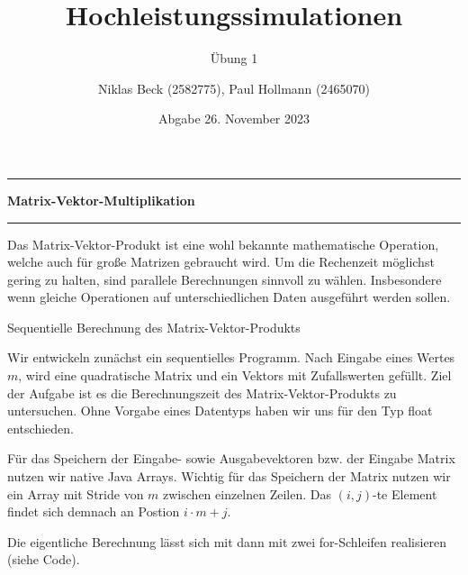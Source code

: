 \documentclass[
ngerman,
subtask=ruled %
]{tudaexercise}
\begin{document}
	
	\title[Übung Hochleistungssimulationen]{Hochleistungssimulationen}
	\subtitle{\"Ubung 1}
	\author{Niklas Beck (2582775), Paul Hollmann (2465070)}
	\date{Abgabe 26. November 2023}
	\maketitle
	
	\hrule
	{\Large \textbf{Matrix-Vektor-Multiplikation}}
	\hrule
	
	Das Matrix-Vektor-Produkt ist eine wohl bekannte mathematische Operation, welche auch für große Matrizen gebraucht wird.
	Um die Rechenzeit möglichst gering zu halten, sind parallele Berechnungen sinnvoll zu wählen.
	Insbesondere wenn gleiche Operationen auf unterschiedlichen Daten ausgeführt werden sollen.%
	
	\begin{task}{Sequentielle Berechnung des Matrix-Vektor-Produkts}\label{task:1}
	
		
		Wir entwickeln zunächst ein sequentielles Programm.
		Nach Eingabe eines Wertes $m$, wird eine quadratische Matrix und ein Vektors mit Zufallswerten gefüllt.  Ziel der Aufgabe ist es die Berechnungszeit des Matrix-Vektor-Produkts zu untersuchen.
		Ohne Vorgabe eines Datentyps haben wir uns für den Typ float entschieden.

		
		Für das Speichern der Eingabe- sowie Ausgabevektoren bzw. der Eingabe Matrix nutzen wir native Java Arrays.
		Wichtig für das Speichern der Matrix nutzen wir ein Array mit Stride von $m$ zwischen einzelnen Zeilen.
		Das $(i,j)$-te Element findet sich demnach an Postion $i\cdot m + j$.
		
		Die eigentliche Berechnung lässt sich mit dann mit zwei for-Schleifen realisieren (siehe Code).
		
	\end{task}
	
\end{document}
